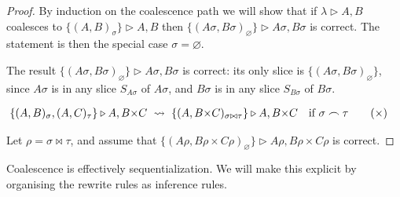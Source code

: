 \documentclass{article}
\theoremstyle{definition}
\theoremstyle{plain}
\newcommand\defn[1]{\textit{\textbf{#1}}}
\newcommand\+{+}
\renewcommand\*{\times}
\newcommand\seq[3][]{{\vdash_{#1}}#2,#3}
\newcommand\net[3]{#1\triangleright #2,#3}
\newcommand\join\bowtie
\newcommand\comp\frown
\newcommand\clink[3][\sigma]{(#2,#3)_{#1}}
\newcommand\coals{\rightsquigarrow}
\newcommand\coal{\coals}%
\begin{document}
\begin{proof}
By induction on the coalescence path we will show that if $\net\lambda AB$ coalesces to $\net{\{\clink AB\}}AB$ then $\net{\{\clink[\varnothing]{A\sigma}{B\sigma}\}}{A\sigma}{B\sigma}$ is correct. The statement is then the special case $\sigma=\varnothing$.

The result $\net{\{\clink[\varnothing]{A\sigma}{B\sigma}\}}{A\sigma}{B\sigma}$ is correct: its only slice is $\{\clink[\varnothing]{A\sigma}{B\sigma}\}$, since $A\sigma$ is in any slice $S_{A\sigma}$ of $A\sigma$, and $B\sigma$ is in any slice $S_{B\sigma}$ of $B\sigma$.

\renewcommand{\+}{{+}}
\renewcommand{\*}{{\times}}
\begin{align}
	\net{\{\clink AB,\clink[\tau]AC\}}A{B\*C}
& ~\coal~ 
	\net{\{\clink[\sigma\join\tau]A{B\*C}\}}A{B\*C}\quad\text{if }\sigma\comp\tau
\tag{$\*$}
\end{align}

Let $\rho=\sigma\join\tau$, and assume that $\net{\{\clink[\varnothing]{A\rho}{B\rho\*C\rho}\}}{A\rho}{B\rho\*C\rho}$ is correct. 

\end{proof}



Coalescence is effectively sequentialization. We will make this explicit by organising the rewrite rules as inference rules. 


%
%
%
%
\end{document}
